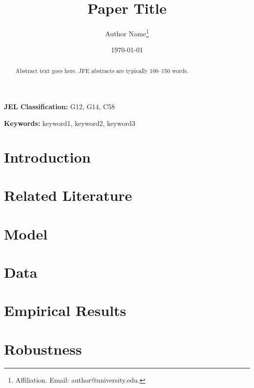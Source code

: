 \documentclass[12pt]{article}
\title{Paper Title}
\author{Author Name\thanks{Affiliation. Email: author@university.edu.}}
\date{\today}
\begin{document}
\maketitle

\begin{abstract}
\noindent
Abstract text goes here. JFE abstracts are typically 100--150 words.
\end{abstract}

\textbf{JEL Classification:} G12, G14, C58

\textbf{Keywords:} keyword1, keyword2, keyword3

\newpage

\section{Introduction}
\label{sec:intro}



\section{Related Literature}
\label{sec:literature}



\section{Model}
\label{sec:model}



\section{Data}
\label{sec:data}



\section{Empirical Results}
\label{sec:results}



\section{Robustness}
\label{sec:robustness}


\end{document}

